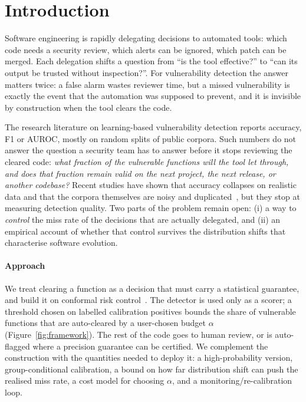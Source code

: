 \section{Introduction}\label{sec:intro}
Software engineering is rapidly delegating decisions to automated tools: which code needs a security review, which alerts can be ignored, which patch can be merged. Each delegation shifts a question from ``is the tool effective?'' to ``can its output be trusted without inspection?''. For vulnerability detection the answer matters twice: a false alarm wastes reviewer time, but a missed vulnerability is exactly the event that the automation was supposed to prevent, and it is invisible by construction when the tool clears the code.

The research literature on learning-based vulnerability detection reports accuracy, F1 or AUROC, mostly on random splits of public corpora. Such numbers do not answer the question a security team has to answer before it stops reviewing the cleared code: \emph{what fraction of the vulnerable functions will the tool let through, and does that fraction remain valid on the next project, the next release, or another codebase?} Recent studies have shown that accuracy collapses on realistic data and that the corpora themselves are noisy and duplicated~\cite{chakraborty2021deep,croft2023data,ding2024primevul}, but they stop at measuring detection quality. Two parts of the problem remain open: (i) a way to \emph{control} the miss rate of the decisions that are actually delegated, and (ii) an empirical account of whether that control survives the distribution shifts that characterise software evolution.

\paragraph{Approach} We treat clearing a function as a decision that must carry a statistical guarantee, and build it on conformal risk control~\cite{vovk2005algorithmic,angelopoulos2023conformal}. The detector is used only as a scorer; a threshold chosen on labelled calibration positives bounds the share of vulnerable functions that are auto-cleared by a user-chosen budget $\alpha$ (Figure~\ref{fig:framework}). The rest of the code goes to human review, or is auto-flagged where a precision guarantee can be certified. We complement the construction with the quantities needed to deploy it: a high-probability version, group-conditional calibration, a bound on how far distribution shift can push the realised miss rate, a cost model for choosing $\alpha$, and a monitoring/re-calibration loop.

